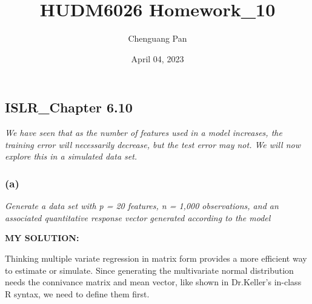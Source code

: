 \documentclass[
]{article}
\title{HUDM6026 Homework\_10}
\author{Chenguang Pan}
\date{April 04, 2023}
\begin{document}
\maketitle

\hypertarget{islr_chapter-6.10}{%
\subsection{ISLR\_Chapter 6.10}\label{islr_chapter-6.10}}

\emph{We have seen that as the number of features used in a model
increases, the training error will necessarily decrease, but the test
error may not. We will now explore this in a simulated data set.}

\hypertarget{a}{%
\subsubsection{(a)}\label{a}}

\emph{Generate a data set with p = 20 features, n = 1,000 observations,
and an associated quantitative response vector generated according to
the model}

\textbf{MY SOLUTION:}

Thinking multiple variate regression in matrix form provides a more
efficient way to estimate or simulate. Since generating the multivariate
normal distribution needs the connivance matrix and mean vector, like
shown in Dr.Keller's in-class R syntax, we need to define them first.
\end{document}
